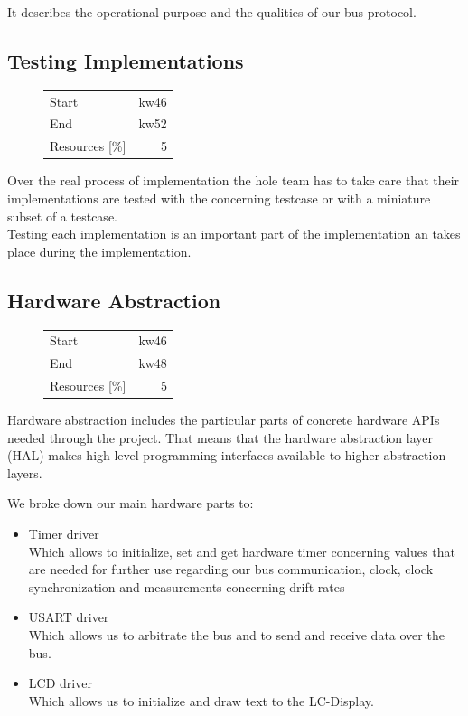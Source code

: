 It describes the operational purpose and the qualities of our bus protocol.
\subsection{Testing Implementations}
\begin{figure}
\begin{tabular}[t]{|lr|}
\hline
Start & kw46\\
End & kw52\\
Resources [\%] & 5\\
\hline
\end{tabular}
\end{figure}
Over the real process of implementation the hole team has to take care that their 
implementations are tested with the concerning testcase or with a miniature subset of a testcase.\\

Testing each implementation is an important part of the implementation an takes place during the implementation.

\subsection{Hardware Abstraction}
\begin{figure}
\begin{tabular}[t]{|lr|}
\hline
Start & kw46\\
End & kw48\\
Resources [\%] & 5\\
\hline
\end{tabular}
\end{figure}
Hardware abstraction includes the particular parts of concrete hardware APIs needed through the project. 
That means that the hardware abstraction layer (HAL) makes high level programming interfaces available to 
higher abstraction layers.

We broke down our main hardware parts to:
\begin{itemize}
 \item Timer driver\\
Which allows to initialize, set and get hardware timer concerning values that are needed
for further use regarding our bus communication, clock, clock synchronization and 
measurements concerning drift rates
 \item USART driver\\
Which allows us to arbitrate the bus and to send and receive data over the bus.
 \item LCD driver\\
Which allows us to initialize and draw text to the LC-Display.
\end{itemize}

